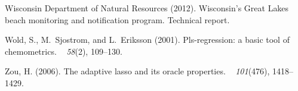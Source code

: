 \documentclass[authoryear,review, 12pt]{elsarticle}
\begin{document}
\begin{thebibliography}{}
{Wisconsin Department of Natural Resources} (2012).
\newblock Wisconsin's {G}reat {L}akes beach monitoring and notification
  program.
\newblock Technical report.

Wold, S., M.~Sjostrom, and L.~Eriksson (2001).
\newblock Pls-regression: a basic tool of chemometrics.
~{\em
  58\/}(2), 109--130.

Zou, H. (2006).
\newblock The adaptive lasso and its oracle properties.
~{\em
  101\/}(476), 1418--1429.

\end{thebibliography}
\end{document}
